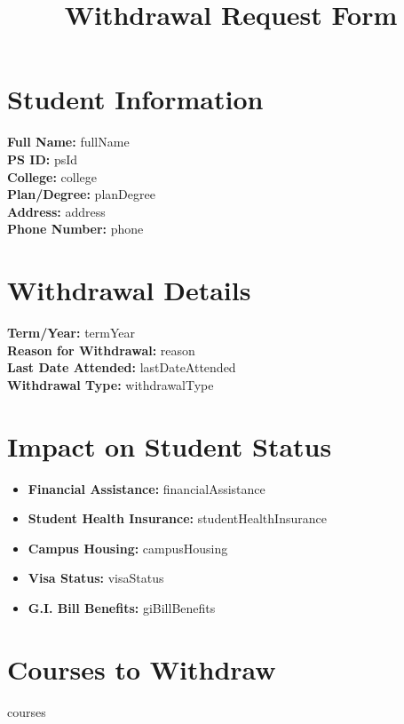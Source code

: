 \documentclass[12pt]{article}
\title{\textbf{Withdrawal Request Form}}
\author{}
\date{}
\begin{document}
\maketitle

\section*{Student Information}
\textbf{Full Name:} {{fullName}} \\[0.5em]
\textbf{PS ID:} {{psId}} \\[0.5em]
\textbf{College:} {{college}} \\[0.5em]
\textbf{Plan/Degree:} {{planDegree}} \\[0.5em]
\textbf{Address:} {{address}} \\[0.5em]
\textbf{Phone Number:} {{phone}} \\[0.5em]

\section*{Withdrawal Details}
\textbf{Term/Year:} {{termYear}} \\[0.5em]
\textbf{Reason for Withdrawal:} {{reason}} \\[0.5em]
\textbf{Last Date Attended:} {{lastDateAttended}} \\[0.5em]
\textbf{Withdrawal Type:} {{withdrawalType}} \\[0.5em]

\section*{Impact on Student Status}
\begin{itemize}[leftmargin=*]
    \item \textbf{Financial Assistance:} {{financialAssistance}}
    \item \textbf{Student Health Insurance:} {{studentHealthInsurance}}
    \item \textbf{Campus Housing:} {{campusHousing}}
    \item \textbf{Visa Status:} {{visaStatus}}
    \item \textbf{G.I. Bill Benefits:} {{giBillBenefits}}
\end{itemize}

\section*{Courses to Withdraw}
{{courses}}
\end{document}
